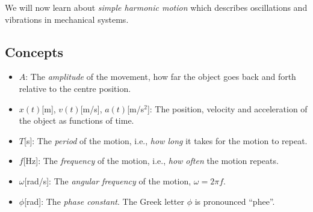 \documentclass[letterpaper,9pt,journal]{IEEEtran}
\begin{document}
We will now learn about \emph{simple harmonic motion} 
which describes oscillations and vibrations in mechanical systems.

%



\vspace{-3mm}
\subsection{Concepts}
\label{ff4e01de0bd379280a0157bd102cc5f0}%

\begin{itemize}
\item  $A$: The \emph{amplitude} of the movement, how far the object goes back and forth relative to the centre position.
\item  $x(t)$[m], $v(t)$[m/s], $a(t)$[m/s$^2$]: The position, velocity and acceleration of the object as functions of time.
\item  $T$[s]: The \emph{period} of the motion, i.e., \emph{how long} it takes for the motion to repeat. 
\item  $f$[Hz]: The \emph{frequency} of the motion, i.e., \emph{how often} the motion repeats.
\item  $\omega$[rad/s]: The \emph{angular frequency} of the motion, $\omega = 2\pi f$.
\item  $\phi$[rad]: The \emph{phase constant}. The Greek letter $\phi$ is pronounced ``phee''. 
\end{itemize}
\end{document}
